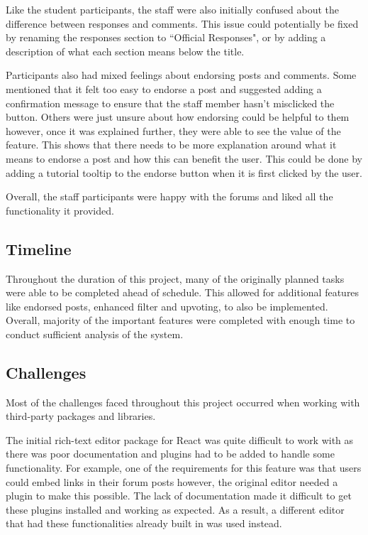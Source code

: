Like the student participants, the staff were also initially confused about the difference between responses and comments.
This issue could potentially be fixed by renaming the responses section to ``Official Responses", or by adding a description of what each section means below the title.

Participants also had mixed feelings about endorsing posts and comments.
Some mentioned that it felt too easy to endorse a post and suggested adding a confirmation message to ensure that the staff member hasn't misclicked the button.
Others were just unsure about how endorsing could be helpful to them however, once it was explained further, they were able to see the value of the feature.
This shows that there needs to be more explanation around what it means to endorse a post and how this can benefit the user.
This could be done by adding a tutorial tooltip to the endorse button when it is first clicked by the user.

Overall, the staff participants were happy with the forums and liked all the functionality it provided.

\subsection{Timeline}

Throughout the duration of this project, many of the originally planned tasks were able to be completed ahead of schedule.
This allowed for additional features like endorsed posts, enhanced filter and upvoting, to also be implemented.
Overall, majority of the important features were completed with enough time to conduct sufficient analysis of the system.

\subsection{Challenges}

Most of the challenges faced throughout this project occurred when working with third-party packages and libraries.

The initial rich-text editor package for React was quite difficult to work with as there was poor documentation and plugins had to be added to handle some functionality.
For example, one of the requirements for this feature was that users could embed links in their forum posts however, the original editor needed a plugin to make this possible.
The lack of documentation made it difficult to get these plugins installed and working as expected.
As a result, a different editor that had these functionalities already built in was used instead.

